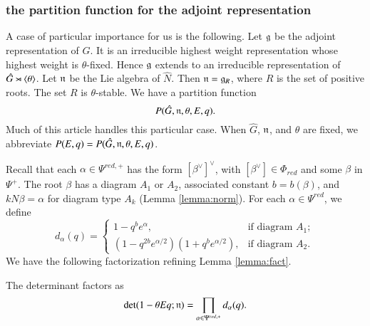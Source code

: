 \subsubsection{the partition function 
for the adjoint representation}\label{sec:adjoint}

A case of particular importance for us is the following.  Let ${\mathfrak g}$ be
the adjoint representation of $\hat G$.  It is an irreducible highest
weight representation whose highest weight is $\theta$-fixed.  Hence
${\mathfrak g}$ extends to an irreducible representation of $\hat
G\rtimes\langle{\theta}\rangle$.  Let ${\mathfrak n}$ be the Lie algebra of $\hat N$.  Then
${\mathfrak n} = {\mathfrak g}_R$, where $R$ is the set of positive roots.  The set $R$ is
$\theta$-stable.  We have a partition function
\[
P(\hat G,{\mathfrak n},\theta,E,q).
\]
Much of this article handles this particular case.  When $\hat G$,
${\mathfrak n}$, and $\theta$ are fixed, we abbreviate $P(E,q) = P(\hat
G,{\mathfrak n},\theta,E,q)$.

Recall that each $\alpha\in \Psi^{red,+}$ has the form
$[\beta^\vee]^\vee$, with $[\beta^\vee]\in \Phi_{red}$ and some
$\beta$ in $\Psi^+$.  The root $\beta$ has a diagram $A_1$ or $A_2$,
associated constant $b=b(\beta)$, and $k N\beta = \alpha$ for diagram
type $A_k$ (Lemma \ref{lemma:norm}).  For each $\alpha\in \Psi^{red}$,
we define
\begin{equation}\label{eqn:d}
d_\alpha(q) =
\begin{cases} {1-q^b e^\alpha},    &\text{if diagram } A_1;\\
{(1-q^{2b} e^{\alpha/2})(1+q^b e^{\alpha/2})},
&\text{if diagram } A_2.
\end{cases}
\end{equation}
We have the following factorization refining Lemma \ref{lemma:fact}.

\begin{lemma} \label{lemma:prod}
The determinant factors as
\[
\det(1-\theta  E q ;{\mathfrak n}) = \prod_{\alpha\in\Psi^{red,+}} d_\alpha(q).
\]
\end{lemma}

